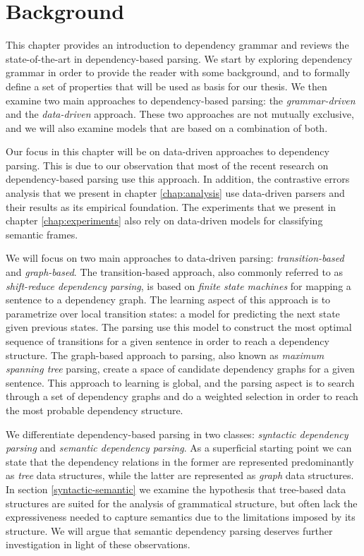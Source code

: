 \chapter{Background}
\label{chap:background}

This chapter provides an introduction to dependency grammar and reviews the state-of-the-art in dependency-based parsing. We start by exploring dependency grammar in order to provide the reader with some background, and to formally define a set of properties that will be used as basis for our thesis. We then examine two main approaches to dependency-based parsing: the \textit{grammar-driven} and the \textit{data-driven} approach. These two approaches are not mutually exclusive, and we will also examine models that are based on a combination of both.

Our focus in this chapter will be on data-driven approaches to dependency parsing. This is due to our observation that most of the recent research on dependency-based parsing use this approach. In addition, the contrastive errors analysis that we present in chapter \ref{chap:analysis} use data-driven parsers and their results as its empirical foundation. The experiments that we present in chapter \ref{chap:experiments} also rely on data-driven models for classifying semantic frames.

We will focus on two main approaches to data-driven parsing: \textit{transition-based} and \textit{graph-based}. The transition-based approach, also commonly referred to as \textit{shift-reduce dependency parsing}, is based on \textit{finite state machines} for mapping a sentence to a dependency graph. The learning aspect of this approach is to parametrize over local transition states: a model for predicting the next state given previous states. The parsing use this model to construct the most optimal sequence of transitions for a given sentence in order to reach a dependency structure. The graph-based approach to parsing, also known as \textit{maximum spanning tree} parsing, create a space of candidate dependency graphs for a given sentence. This approach to learning is global, and the parsing aspect is to search through a set of dependency graphs and do a weighted selection in order to reach the most probable dependency structure.


We differentiate dependency-based parsing in two classes: \textit{syntactic dependency parsing} and \textit{semantic dependency parsing}. As a superficial starting point we can state that the dependency relations in the former are represented predominantly as \textit{tree} data structures, while the latter are represented as \textit{graph} data structures. In section \ref{syntactic-semantic} we examine the hypothesis that tree-based data structures are suited for the analysis of grammatical structure, but often lack the expressiveness needed to capture semantics due to the limitations imposed by its structure. We will argue that semantic dependency parsing deserves further investigation in light of these observations.

